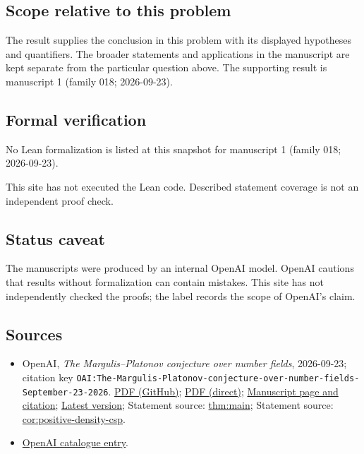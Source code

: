 \documentclass[11pt]{article}
\begin{document}
\subsection{Scope relative to this problem}
The result supplies the conclusion in this problem with its displayed hypotheses and quantifiers. The broader statements and applications in the manuscript are kept separate from the particular question above. The supporting result is manuscript 1 (family 018; 2026-09-23).

\subsection{Formal verification}
No Lean formalization is listed at this snapshot for manuscript 1 (family 018; 2026-09-23).

This site has not executed the Lean code. Described statement coverage is not an independent proof check.

\subsection{Status caveat}
The manuscripts were produced by an internal OpenAI model. OpenAI cautions that results without formalization can contain mistakes. This site has not independently checked the proofs; the label records the scope of OpenAI's claim.

\subsection{Sources}
\begin{itemize}
\item OpenAI, \emph{The Margulis–Platonov conjecture over number fields}, 2026-09-23; citation key \texttt{OAI:The-Margulis-Platonov-conjecture-over-number-fields-September-23-2026}. \href{https://github.com/openai/math/blob/adc7f1241b42e322a6451854ab7e4b4c146bf78a/preprints/The-Margulis-Platonov-conjecture-over-number-fields-September-23-2026/paper.pdf}{PDF (GitHub)}; \href{https://github.com/openai/math/raw/adc7f1241b42e322a6451854ab7e4b4c146bf78a/preprints/The-Margulis-Platonov-conjecture-over-number-fields-September-23-2026/paper.pdf}{PDF (direct)}; \href{https://github.com/openai/math/blob/adc7f1241b42e322a6451854ab7e4b4c146bf78a/preprints/The-Margulis-Platonov-conjecture-over-number-fields-September-23-2026/README.md}{Manuscript page and citation}; \href{https://github.com/openai/math/blob/main/preprints/The-Margulis-Platonov-conjecture-over-number-fields-September-23-2026/paper.pdf}{Latest version}; Statement source: \href{https://github.com/openai/math/blob/adc7f1241b42e322a6451854ab7e4b4c146bf78a/preprints/The-Margulis-Platonov-conjecture-over-number-fields-September-23-2026/build/sections/introduction.tex\#L21}{thm:main}; Statement source: \href{https://github.com/openai/math/blob/adc7f1241b42e322a6451854ab7e4b4c146bf78a/preprints/The-Margulis-Platonov-conjecture-over-number-fields-September-23-2026/build/sections/introduction.tex\#L95}{cor:positive-density-csp}.
\item \href{https://github.com/openai/math/blob/adc7f1241b42e322a6451854ab7e4b4c146bf78a/CONTENTS.md}{OpenAI catalogue entry}.
\end{itemize}
\end{document}
